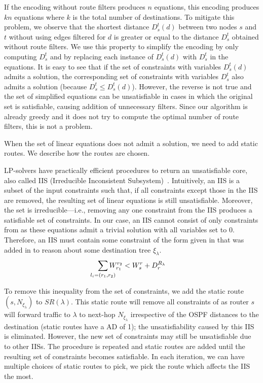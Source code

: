 If the encoding without route filters produces $n$ equations, this
encoding produces $kn$ equations where $k$ is the total number of destinations.  
To mitigate this problem, we observe that the shortest distance $D_s^t(d)$ between two
nodes $s$ and $t$ without using edges filtered for $d$ is
greater or equal to the distance $D_s^t$ obtained without route filters.  
We use this property to simplify the
encoding by only computing $D_s^t$ and by replacing each instance of
$D_s^t(d)$ with $D_s^t$ in the equations.  It is easy to see that 
if the set of constraints with variables $D_s^t(d)$ admits a solution,
the corresponding set of constraints with variables $D_s^t$ 
also admits a solution (because $D_s^t\leq
D_s^t(d)$).  However, the reverse is not true and the set of
simplified equations can be unsatisfiable in cases in which the
original set is satisfiable, causing addition of unnecessary filters.
Since our algorithm is already greedy and it does not try to compute the optimal 
number of route filters, this is not a problem.


When the set of linear equations does not admit a solution, we 
need to add static routes. We describe how the routes are chosen.

LP-solvers have practically efficient procedures to return an
unsatisfiable core, also called IIS (Irreducible Inconsistent Subsystem)~\cite{chinneck2007feasibility}. 
Intuitively, an IIS is a subset of the input constraints such that,
if all constraints except those in the IIS are removed, the resulting set of
linear equations is still unsatisfiable. Moreover, the set is irreducible---i.e., removing 
any one constraint from the IIS produces a satisfiable set of constraints. 
In our case, an IIS cannot consist of only 
constraints from  as these equations
admit a trivial solution with all variables set to 0. 
Therefore, an IIS must contain some constraint of the form
given in  
that was added in to reason about some destination tree $\xi_\lambda$.
\[
\sum_{\mathclap{\substack{l_i=(r_1,r_2)}}} 
W_{r_1}^{r_2} < W_s^r + D_r^{R_\lambda}  
\]	

To remove this inequality from the set of constraints, we add the static route $(s,N_{\xi_\lambda})$ to $SR(\lambda)$.
This static route will remove all constraints of  as router $s$ 
will forward traffic to $\lambda$ to next-hop $N_{\xi_\lambda}$ irrespective of
the OSPF distances to the destination (static routes have a AD of 1); the 
unsatisfiability caused by this IIS is eliminated. However, the new set of
constraints may still be unsatisfiable due to other IISs.
The procedure is repeated and static routes are added until the resulting set of
constraints becomes satisfiable. In each iteration, we can have multiple 
choices of static routes to pick, we pick the route which affects the IIS the most. 

